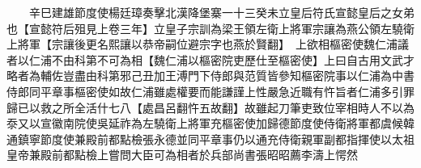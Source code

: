　　辛巳建雄節度使楊廷璋奏擊北漢降堡寨一十三癸未立皇后符氏宣懿皇后之女弟也【宣懿符后殂見上卷三年】立皇子宗訓為梁王領左衛上將軍宗讓為燕公領左驍衛上將軍【宗讓後更名熙讓以恭帝嗣位避宗字也燕於賢翻】　上欲相樞密使魏仁浦議者以仁浦不由科第不可為相【魏仁浦以樞密院吏歷仕至樞密使】上曰自古用文武才略者為輔佐豈盡由科第邪己丑加王溥門下侍郎與范質皆參知樞密院事以仁浦為中書侍郎同平章事樞密使如故仁浦雖處權要而能謙謹上性嚴急近職有忤旨者仁浦多引罪歸已以救之所全活什七八【處昌呂翻忤五故翻】故雖起刀筆吏致位宰相時人不以為沗又以宣徽南院使吳延祚為左驍衛上將軍充樞密使加歸德節度使侍衛將軍都虞候韓通鎮寧節度使兼殿前都點檢張永德並同平章事仍以通充侍衛親軍副都指揮使以太祖皇帝兼殿前都點檢上嘗問大臣可為相者於兵部尚書張昭昭薦李濤上愕然